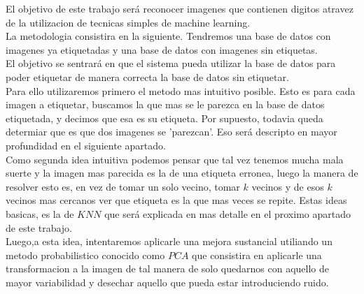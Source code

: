 El objetivo de este trabajo será reconocer imagenes que contienen digitos atravez de la utilizacion de tecnicas simples de machine learning.
\\
La metodologia consistira en la siguiente. Tendremos una base de datos con imagenes ya etiquetadas y una base de datos con imagenes sin etiquetas.
\\
El objetivo se sentrará en que el sistema pueda utilizar la base de datos para poder etiquetar de manera correcta la base de datos sin etiquetar.
\\
Para ello utilizaremos primero el metodo mas intuitivo posible. Esto es para cada imagen a etiquetar, buscamos la que mas se le parezca en la base de datos etiquetada, y decimos que esa es su etiqueta. Por supuesto, todavia queda determiar que es que dos imagenes se 'parezcan'. Eso será descripto en mayor profundidad en el siguiente apartado.
\\
Como segunda idea intuitiva podemos pensar que tal vez tenemos mucha mala suerte y la imagen mas parecida es la de una etiqueta erronea, luego la manera de resolver esto es, en vez de tomar un solo vecino, tomar $k$ vecinos y de esos $k$ vecinos mas cercanos ver que etiqueta es la que mas veces se repite. Estas ideas basicas, es la de $KNN$ que será explicada en mas detalle en el proximo apartado de este trabajo.
\\
Luego,a esta idea, intentaremos aplicarle una mejora sustancial utiliando un metodo probabilistico conocido como $PCA$ que consistira en aplicarle una transformacion a la imagen de tal manera de solo quedarnos con aquello de mayor variabilidad y desechar aquello que pueda estar introduciendo ruido.